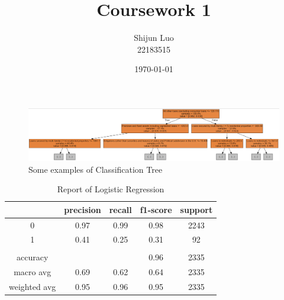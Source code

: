 \documentclass[11pt]{report}
\begin{document}
\title{Coursework 1}
\author{Shijun Luo \\22183515}
\date{\today}
\maketitle

\begin{figure}[h]
    \centering
    \includegraphics[width = \linewidth]{tree_1.png}
    \caption{Some examples of Classification Tree}\label{fig:tree_1}
\end{figure}

\begin{table}[h]
    \caption[table]{Report of Logistic Regression}
    \vspace{0.5em}\centering
    \begin{tabular}{ccccc}
        \toprule[1.5pt]
        &    precision    &recall  &f1-score   &support\\
        \midrule[1pt]                                   
        0       &0.97      &0.99      &0.98      &2243\\
        1       &0.41      &0.25      &0.31      &92\\
          & & & &                                   \\
 accuracy      &           &          &0.96      &2335\\
macro avg      & 0.69      &0.62      &0.64      &2335\\
weighted avg    &   0.95    &  0.96    &  0.95    &  2335\\
        \bottomrule[1.5pt]
    \end{tabular}
\end{table}
\end{document}
